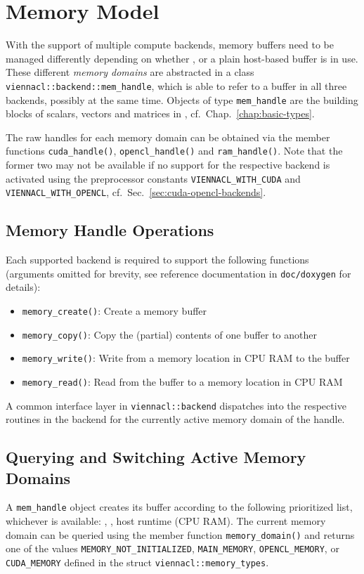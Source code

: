 \chapter{Memory Model}
With the support of multiple compute backends, memory buffers need to be managed differently depending on whether {\CUDA}, {\OpenCL} or a plain host-based buffer is in use.
These different \emph{memory domains} are abstracted in a class \lstinline|viennacl::backend::mem_handle|,
which is able to refer to a buffer in all three backends, possibly at the same time. Objects of type \lstinline|mem_handle| are the building blocks of scalars, vectors and matrices in {\ViennaCL}, cf.~Chap.~\ref{chap:basic-types}.


The raw handles for each memory domain can be obtained via the member functions
\lstinline|cuda_handle()|, \lstinline|opencl_handle()| and \lstinline|ram_handle()|.
Note that the former two may not be available if no support for the respective backend is activated using the preprocessor constants \lstinline|VIENNACL_WITH_CUDA| and \lstinline|VIENNACL_WITH_OPENCL|, cf.~Sec.~\ref{sec:cuda-opencl-backends}.

\section{Memory Handle Operations}
Each supported backend is required to support the following functions (arguments omitted for brevity, see reference documentation in \lstinline|doc/doxygen| for details):
\begin{itemize}
 \item \lstinline|memory_create()|: Create a memory buffer
 \item \lstinline|memory_copy()|: Copy the (partial) contents of one buffer to another
 \item \lstinline|memory_write()|: Write from a memory location in CPU RAM to the buffer
 \item \lstinline|memory_read()|: Read from the buffer to a memory location in CPU RAM
\end{itemize}
A common interface layer in \lstinline|viennacl::backend| dispatches into the respective routines in the backend for the currently active memory domain of the handle.


\section{Querying and Switching Active Memory Domains}
A \lstinline|mem_handle| object creates its buffer according to the following prioritized list, whichever is available: {\CUDA}, {\OpenCL}, host runtime (CPU RAM).
The current memory domain can be queried using the member function \lstinline|memory_domain()| and returns one of the values \lstinline|MEMORY_NOT_INITIALIZED|, \lstinline|MAIN_MEMORY|, \lstinline|OPENCL_MEMORY|, or \lstinline|CUDA_MEMORY|
defined in the struct \lstinline|viennacl::memory_types|.

